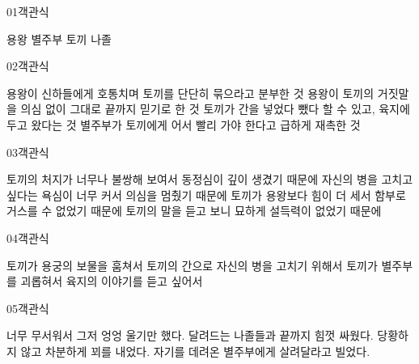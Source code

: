 \documentclass[fs95,seriesFre]{korfarm-base}
\begin{document}

\begin{kfQBlock}{01}{객관식}
\begin{kfChoices}
\kfChoice 용왕
\kfChoice 별주부
\kfChoice 토끼
\kfChoice 나졸
\end{kfChoices}
\end{kfQBlock}
\begin{kfQBlock}{02}{객관식}
\begin{kfChoices}
\kfChoice 용왕이 신하들에게 호통치며 토끼를 단단히 묶으라고 분부한 것
\kfChoice 용왕이 토끼의 거짓말을 의심 없이 그대로 끝까지 믿기로 한 것
\kfChoice 토끼가 간을 넣었다 뺐다 할 수 있고, 육지에 두고 왔다는 것
\kfChoice 별주부가 토끼에게 어서 빨리 가야 한다고 급하게 재촉한 것
\end{kfChoices}
\end{kfQBlock}
\begin{kfQBlock}{03}{객관식}
\begin{kfChoices}
\kfChoice 토끼의 처지가 너무나 불쌍해 보여서 동정심이 깊이 생겼기 때문에
\kfChoice 자신의 병을 고치고 싶다는 욕심이 너무 커서 의심을 멈췄기 때문에
\kfChoice 토끼가 용왕보다 힘이 더 세서 함부로 거스를 수 없었기 때문에
\kfChoice 토끼의 말을 듣고 보니 묘하게 설득력이 없었기 때문에
\end{kfChoices}
\end{kfQBlock}
\begin{kfQBlock}{04}{객관식}
\begin{kfChoices}
\kfChoice 토끼가 용궁의 보물을 훔쳐서
\kfChoice 토끼의 간으로 자신의 병을 고치기 위해서
\kfChoice 토끼가 별주부를 괴롭혀서
\kfChoice 육지의 이야기를 듣고 싶어서
\end{kfChoices}
\end{kfQBlock}
\begin{kfQBlock}{05}{객관식}
\begin{kfChoices}
\kfChoice 너무 무서워서 그저 엉엉 울기만 했다.
\kfChoice 달려드는 나졸들과 끝까지 힘껏 싸웠다.
\kfChoice 당황하지 않고 차분하게 꾀를 내었다.
\kfChoice 자기를 데려온 별주부에게 살려달라고 빌었다.
\end{kfChoices}
\end{kfQBlock}
\end{document}
